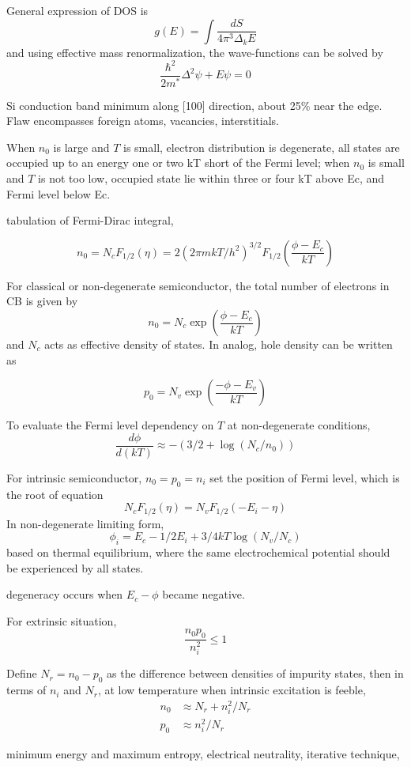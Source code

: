 General expression of DOS is 
\[
g(E) =  \int \frac{dS}{4\pi^3\Delta_kE}
\]
and using effective mass renormalization, the wave-functions can be solved by
\[
\frac{\hbar^2}{2m^*} \Delta^2\psi + E\psi = 0
\]

Si conduction band minimum along [100] direction, about 25\% near the edge. Flaw encompasses foreign atoms, vacancies, interstitials. 

When $n_0$ is large and $T$ is small, electron distribution is degenerate, all states are occupied up to an energy one or two kT short of the Fermi level; when $n_0$ is small and $T$ is not too low, occupied state lie within three or four kT above Ec, and Fermi level below Ec. 

tabulation of Fermi-Dirac integral, 

\[
n_0 = N_c F_{1/2}(\eta) = 2(2\pi mkT/h^2)^{3/2}F_{1/2}(\frac{\phi - E_c}{kT})
\]

For classical or non-degenerate semiconductor, the total number of electrons in CB is given by
\[
n_0 = N_c\exp(\frac{\phi - E_c}{kT})
\]
and $N_c$ acts as effective density of states. In analog, hole density can be written as

\[
p_0 = N_v\exp(\frac{-\phi - E_v}{kT})
\]

To evaluate the Fermi level dependency on $T$ at non-degenerate conditions, 
\[
\frac{d\phi}{d(kT)} \approx - (3/2 + \log(N_c/n_0))
\]

For intrinsic semiconductor, $n_0= p_0 = n_i$ set the position of Fermi level, which is the root of equation
\[
 N_c F_{1/2}(\eta) =  N_v F_{1/2}(-E_i - \eta)
\]
In non-degenerate limiting form, 
\[
\phi_i = E_c - 1/2E_i + 3/4kT\log(N_v/N_c)
\]
based on thermal equilibrium, where the same electrochemical potential should be experienced by all states. 

degeneracy occurs when $E_c - \phi$ became negative. 

For extrinsic situation, 
\[
\frac{n_0p_0}{n_i^2} \leq 1
\]

Define $N_r = n_0 - p_0$ as the difference between densities of impurity states, then in terms of $n_i$ and $N_r$, at low temperature when intrinsic excitation is feeble, 
\begin{align}
n_0 &\approx N_r + n_i^2/N_r\\
p_0 &\approx n_i^2/N_r
\end{align}


minimum energy and maximum entropy, electrical neutrality, iterative technique, 

